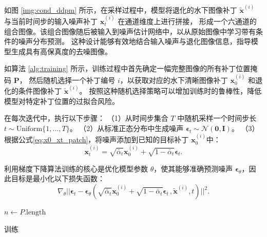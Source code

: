 如图 \ref{img:cond_ddpm} 所示，在采样过程中，模型将退化的水下图像补丁 $\tilde{\mathbf{x}}^{(i)}$ 与当前时间步的输入噪声补丁 $\mathbf{x}^{(i)}_t$ 在通道维度上进行拼接，
形成一个六通道的组合图像。该组合图像随后被输入到噪声估计网络中，以从原始图像中学习带有条件的噪声分布预测。
这种设计能够有效地结合输入噪声与退化图像信息，指导模型生成具有高保真度的去噪图像。

如算法 \ref{alg:training} 所示，训练过程中首先确定一幅完整图像的所有补丁位置掩码 $\bm{P}$，
然后随机选择一个补丁编号 $i$，以获取对应的水下清晰图像补丁 $\mathbf{x}_0^{(i)}$ 和退化的条件图像补丁 $\tilde{\mathbf{x}}^{(i)}$。
按照这种随机选择策略可以增加训练时的鲁棒性，降低模型对特定补丁位置的过拟合风险。

在每次迭代中，执行以下步骤：
（1）从时间步集合 $T$ 中随机采样一个时间步长$t \sim \text{Uniform}\{1,\ldots,T\}$。
（2）从标准正态分布中生成噪声 $\bm{\epsilon}_t \sim \mathcal{N}(\mathbf{0}, \mathbf{I})$。
（3）根据公式\eqref{eq:x0_xt_patch}，将噪声添加到已知的目标补丁 $\mathbf{x}_0^{(i)}$中：
\begin{equation}
\label{eq:x0_xt_patch}
    \mathbf{x}_t^{(i)} = \sqrt{\bar{\alpha}_t} \mathbf{x}_0^{(i)} + \sqrt{1 - \bar{\alpha}_t} \bm{\epsilon}_t.
\end{equation}

利用梯度下降算法训练的核心是优化模型参数 $\theta$，使其能够准确预测噪声 $\bm{\epsilon}_\theta$，因此目标是最小化以下损失函数：
\begin{equation}
    \nabla_{\theta}\vert\vert\bm{\epsilon}_t -  \bm{\epsilon}_{\theta}(\sqrt{\bar{\alpha}_t}\mathbf{x}_0^{(i)}+\sqrt{1-\bar{\alpha}_t}\bm{\epsilon}_t\,,\tilde{\mathbf{x}}^{(i)},t)\vert\vert^2.
\end{equation}

\begin{algorithm}
    \SetAlgoLined
  
    $n \leftarrow P.\text{length}$\;
    \caption{训练}
    \label{alg:training}
  \end{algorithm}

